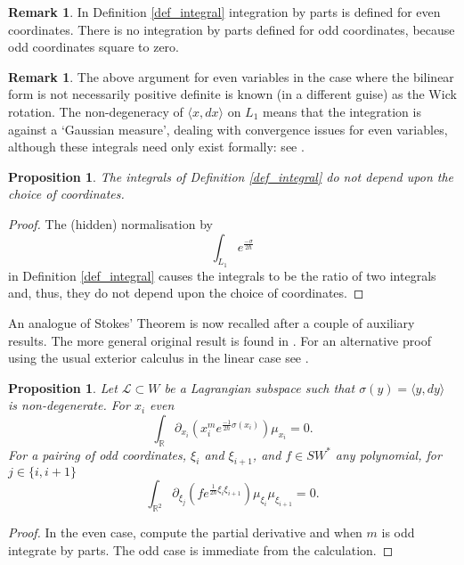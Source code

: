 \documentclass[]{amsart}
\newtheorem{proposition}[theorem]{Proposition}
\theoremstyle{definition}
\newtheorem{remark}[theorem]{Remark}
\begin{document}
\begin{remark}
In Definition \ref{def_integral} integration by parts is defined for even coordinates. There is no integration by parts defined for odd coordinates, because odd coordinates square to zero.
\end{remark}

\begin{remark}\label{rem_non-degenerate_form}
The above argument for even variables in the case where the bilinear form is not necessarily positive definite is known (in a different guise) as the Wick rotation. The non-degeneracy of $\langle x,dx \rangle$ on $L_1$ means that the integration is against a `Gaussian measure', dealing with convergence issues for even variables, although these integrals need only exist formally: see \cite{hamilton_laz_graph}.
\end{remark}

\begin{proposition}
The integrals of Definition \ref{def_integral} do not depend upon the choice of coordinates.
\end{proposition}
\begin{proof}
The (hidden) normalisation by 
\[
\int_{L_1} e^\frac{-\sigma}{2\hbar}
\]
in Definition \ref{def_integral} causes the integrals to be the ratio of two integrals and, thus, they do not depend upon the choice of coordinates.
\end{proof}

An analogue of Stokes' Theorem is now recalled after a couple of auxiliary results. The more general original result is found in \cite{schwarz}. For an alternative proof using the usual exterior calculus in the linear case see \cite{hamilton_laz_graph}.

\begin{proposition}\label{prop_integral_of_derivative}
Let $\mathcal{L}\subset W$ be a Lagrangian subspace such that $\sigma(y)=\langle y,dy \rangle$ is non-degenerate. For $x_i$ even
\[
\int_{\mathbb{R}} \partial_{x_i} (x_i^m e^{\frac{-1}{2\hbar}\sigma(x_i)}) \mu_{x_i} =0.
\]
For a pairing of odd coordinates, $\xi_i$ and $\xi_{i+1}$, and $f\in SW^*$ any polynomial, for $j\in\lbrace i,i+1 \rbrace$
\[
\int_{\mathbb{R}^2} \partial_{\xi_j} (f e^{\frac{1}{2\hbar}\xi_i \xi_{i+1} }) \mu_{\xi_i} \mu_{\xi_{i+1}} =0.
\]
\end{proposition}
\begin{proof}
In the even case, compute the partial derivative and when $m$ is odd integrate by parts. The odd case is immediate from the calculation.
\end{proof}
\end{document}
